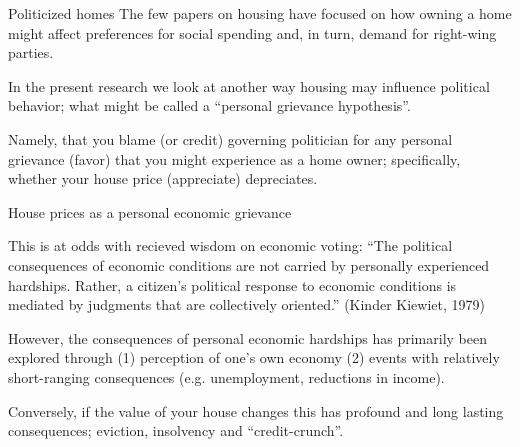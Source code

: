 \documentclass[aspectratio=169]{beamer}
\begin{document}
		\begin{frame}{Politicized homes}
		The few papers on housing have focused on how owning a home might affect preferences for social spending and, in turn, demand for right-wing parties. 	
						\vspace{0.2in}	
						
		In the present research we look at another way housing may influence political behavior; what might be called a ``personal grievance hypothesis''.
		
			\vspace{0.2in}	
			
		Namely, that you blame (or credit) governing politician for any personal grievance (favor) that you might experience as a home owner; specifically, whether your house price (appreciate) depreciates.
		
					\vspace{0.2in}	
					
				
			\end{frame}	
	\begin{frame}{House prices as a personal economic grievance}
		
	
		
	This is at odds with recieved wisdom on economic voting: ``The political consequences of economic conditions are not carried by personally experienced hardships. Rather, a citizen's political response to economic conditions is mediated by judgments that are collectively oriented.'' (Kinder Kiewiet, 1979)
	
	\vspace{0.2in}
	
	However, the consequences of personal economic hardships has primarily been explored through (1) perception of one's own economy (2) events with relatively short-ranging consequences (e.g. unemployment, reductions in income).
	
	\vspace{0.2in}
	
	Conversely, if the value of your house changes this has profound and long lasting consequences; eviction, insolvency and ``credit-crunch''.	
			
	\end{frame}	
	
	
	
\end{document}
